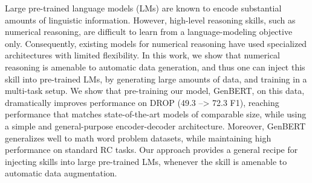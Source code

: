 Large pre-trained language models (LMs) are known to encode substantial amounts of linguistic information. However, high-level reasoning skills, such as numerical reasoning, are difficult to learn from a language-modeling objective only. Consequently, existing models for numerical reasoning have used specialized architectures with limited flexibility. In this work, we show that numerical reasoning is amenable to automatic data generation, and thus one can inject this skill into pre-trained LMs, by generating large amounts of data, and training in a multi-task setup. We show that pre-training our model, GenBERT, on this data, dramatically improves performance on DROP (49.3 --> 72.3 F1), reaching performance that matches state-of-the-art models of comparable size, while using a simple and general-purpose encoder-decoder architecture. Moreover, GenBERT generalizes well to math word problem datasets, while maintaining high performance on standard RC tasks. Our approach provides a general recipe for injecting skills into large pre-trained LMs, whenever the skill is amenable to automatic data augmentation.

